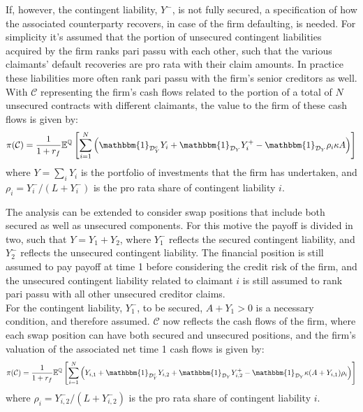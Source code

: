 \documentclass[../main.tex]{subfiles}
\begin{document}
        If, however, the contingent liability, $Y^{-}$, is not fully secured, a specification of how the associated counterparty recovers, in case of the firm defaulting, is needed.
        For simplicity it's assumed that the portion of unsecured contingent liabilities acquired by the firm ranks pari passu with each other, such that the various claimants' default recoveries are pro rata with their claim amounts.
        In practice these liabilities more often rank pari passu with the firm's senior creditors as well.
        With $\mathcal{C}$ representing the firm's cash flows related to the portion of a total of $N$ unsecured contracts with different claimants, the value to the firm of these cash flows is given by:
        \begin{equation}
            \pi(\mathcal{C}) = \discountfactor \mathbb{E}^{\mathbb{Q}}\left[
            \sum_{i=1}^{N} \left(
                \mathbbm{1}_{\mathcal{D}_{Y}^{c}}Y_{i}
                + \mathbbm{1}_{\mathcal{D}_{Y}} Y_{i}^{+}
                - \mathbbm{1}_{\mathcal{D}_{Y}} \rho_{i} \kappa A
            \right)\right]
        \end{equation}
        where $Y = \sum_{i} Y_{i}$ is the portfolio of investments that the firm has undertaken, and $\rho_{i} = Y_{i}^{-}/(L + Y_{i}^{-})$ is the pro rata share of contingent liability $i$.


        The analysis can be extended to consider swap positions that include both secured as well as unsecured components.
        For this motive the payoff is divided in two, such that $Y=Y_1 + Y_2$, where $Y_1^{-}$ reflects the secured contingent liability, and $Y_2^{-}$ reflects the unsecured contingent liability.
        The financial position is still assumed to pay payoff at time 1 before considering the credit risk of the firm, and the unsecured contingent liability related to claimant $i$ is still assumed to rank pari passu with all other unsecured creditor claims.\\
        For the contingent liability, $Y_1^{-}$, to be secured, $A+Y_1 > 0$ is a necessary condition, and therefore assumed.
        $\mathcal{C}$ now reflects the cash flows of the firm, where each swap position can have both secured and unsecured positions, and the firm's valuation of the associated net time 1 cash flows is given by:
        \begin{equation}
            \pi(\mathcal{C}) = \discountfactor \mathbb{E}^{\mathbb{Q}}\left[
            \sum_{i=1}^{N} \left(
                Y_{i,1}
                + \mathbbm{1}_{\mathcal{D}_{Y}^{c}}Y_{i,2}
                + \mathbbm{1}_{\mathcal{D}_{Y}} Y_{i,2}^{+}
                - \mathbbm{1}_{\mathcal{D}_{Y}} \kappa (A + Y_{i,1}) \rho_{i}
            \right)\right]
        \end{equation}
        where $\rho_{i} = Y_{i,2}^{-}/(L + Y_{i,2}^{-})$ is the pro rata share of contingent liability $i$.
        
\end{document}
